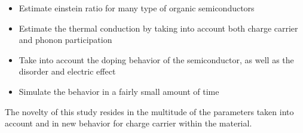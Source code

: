 \begin{itemize}
    \item Estimate einstein ratio for many type of organic semiconductors
    \item Estimate the thermal conduction by taking into account both charge carrier and phonon participation
    \item Take into account the doping behavior of the semiconductor, as well as the disorder and electric effect
    \item Simulate the behavior in a fairly small amount of time
\end{itemize}

The novelty of this study resides in the multitude of the parameters taken into account and in new behavior for charge carrier within the material.

